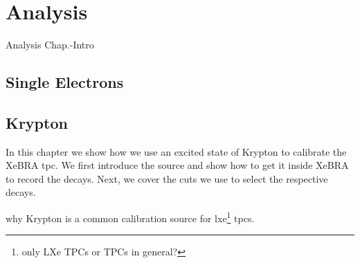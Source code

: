 \FloatBarrier
\chapter{Analysis}
\label{chap:Analysis}
\FloatBarrier

Analysis Chap.-Intro

\FloatBarrier
\section{Single Electrons}
\label{sec:SE}
\FloatBarrier



\newpage

\newpage

\newpage

\newpage

\newpage

\FloatBarrier
\section{Krypton}
\label{sec:Kr}
\FloatBarrier

In this chapter we show how we use an excited state of Krypton to calibrate the XeBRA \gls{tpc}.
We first introduce the source and show how to get it inside XeBRA to record the decays.
Next, we cover the cuts we use to select the respective decays.

why Krypton is a common calibration source for \gls{lxe}\footnote{only LXe TPCs or TPCs in general?} \gls{tpc}s.




\newpage

\newpage

\newpage

\newpage

\newpage

\newpage

\newpage

\newpage
\FloatBarrier
